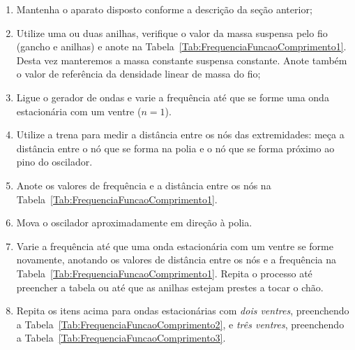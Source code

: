 \begin{enumerate}
\item Mantenha o aparato disposto conforme a descrição da seção anterior;
\item Utilize uma ou duas anilhas, verifique o valor da massa suspensa pelo fio (gancho e anilhas) e anote na Tabela~\ref{Tab:FrequenciaFuncaoComprimento1}. Desta vez manteremos a massa constante suspensa constante. Anote também o valor de referência da densidade linear de massa do fio;
\item Ligue o gerador de ondas e varie a frequência até que se forme uma onda estacionária com um ventre ($n = 1$).
\item Utilize a trena para medir a distância entre os nós das extremidades: meça a distância entre o nó que se forma na polia e o nó que se forma próximo ao pino do oscilador.
\item Anote os valores de frequência e a distância entre os nós na Tabela~\ref{Tab:FrequenciaFuncaoComprimento1}.
\item Mova o oscilador aproximadamente  em direção à polia.
\item Varie a frequência até que uma onda estacionária com um ventre se forme novamente, anotando os valores de distância entre os nós e a frequência na Tabela~\ref{Tab:FrequenciaFuncaoComprimento1}. Repita o processo até preencher a tabela ou até que as anilhas estejam prestes a tocar o chão.
\item Repita os itens acima para ondas estacionárias com \emph{dois ventres}, preenchendo a Tabela~\ref{Tab:FrequenciaFuncaoComprimento2}, e \emph{três ventres}, preenchendo a Tabela~\ref{Tab:FrequenciaFuncaoComprimento3}.
\end{enumerate}

\cleardoublepage


\vspace{15mm}

